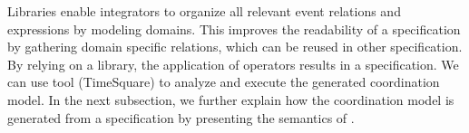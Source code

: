 Libraries enable integrators to organize all relevant event relations and expressions by modeling domains. This improves the readability of a \bcool specification by gathering domain specific relations, which can be reused in other specification. By relying on a \moccml library, the application of \bcool operators results in a \ccsl specification. We can use \ccsl tool (\eg TimeSquare\cite{timesquarebib}) to analyze and execute the generated coordination model. In the next subsection, we further explain how the coordination model is generated from a \bcool specification by presenting the semantics of \bcool.   




	

